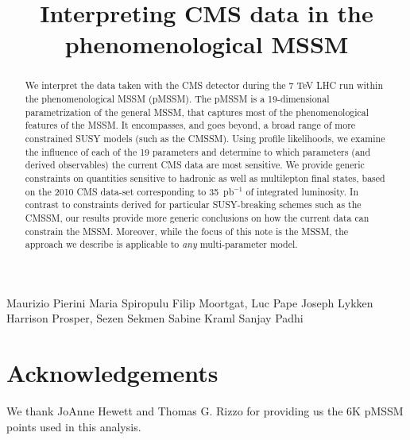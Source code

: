 \documentclass{cmspaper}
\begin{document}
%
\begin{titlepage}
\title{Interpreting CMS data in the phenomenological MSSM}

  \begin{Authlist}
    Maurizio Pierini
    Maria Spiropulu
    Filip Moortgat, Luc Pape
    Joseph Lykken
    Harrison Prosper, Sezen Sekmen
    Sabine Kraml
    Sanjay Padhi
    
  \end{Authlist}

\begin{abstract}
We interpret the data taken with the CMS detector during the 7 TeV LHC run within the phenomenological MSSM (pMSSM). 
The pMSSM is a 19-dimensional parametrization of the general MSSM, that captures most of the phenomenological features of the MSSM.
It encompasses, and goes beyond, a broad range of more constrained SUSY models (such as the CMSSM). 
Using profile likelihoods, we examine the influence of each of the 
19 parameters and determine to which parameters 
(and derived observables) the current CMS data are most sensitive. 
We provide generic constraints on quantities sensitive to hadronic as well as multilepton final states, 
based on the 2010 CMS data-set corresponding to 35~pb$^{-1}$ of integrated luminosity.
In contrast to constraints derived for particular SUSY-breaking schemes 
such as the CMSSM, our results provide more generic conclusions on how the current 
data can constrain the MSSM. 
Moreover, while the focus of this note is the 
MSSM, the approach we describe is applicable to \emph{any} multi-parameter model.
\end{abstract}
\end{titlepage}




%




\section*{Acknowledgements}

We thank JoAnne Hewett and Thomas G. Rizzo for providing us the 6K pMSSM points used in this analysis.

\clearpage


%
%

\end{document}
